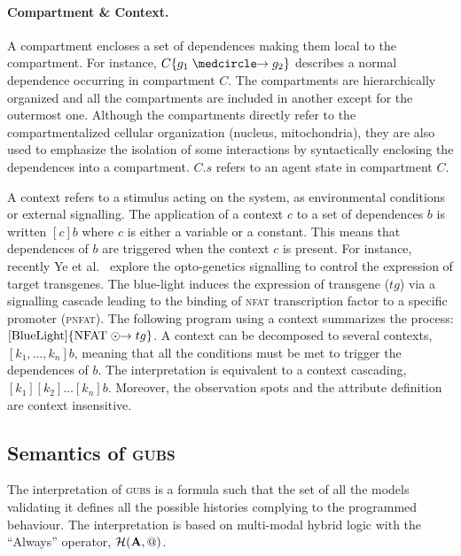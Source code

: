 \documentclass{eptcs}
\newcommand{\eg}[0]{\abbrev{\textit{e.g.}}}
\newcounter{ti}
\begin{document}
\paragraph{Compartment \& Context.} A compartment encloses a set of dependences making them local to the compartment. For instance, $ C \{ g_1 \cause g_2 \}$ describes a normal dependence occurring in compartment $C$. The compartments are hierarchically organized and all the compartments are included in another except for the outermost one.
Although the compartments directly refer to the compartmentalized cellular organization (\eg nucleus, mitochondria), they are also used to emphasize the isolation of some interactions by syntactically enclosing the dependences into a compartment. $C.s$ refers to an agent state in compartment $C$. 

A context refers to a stimulus acting on the system, as environmental conditions or external signalling. The application of a context $c$ to a set of dependences $b$ is written $[c]b$ where $c$ is either a variable or a constant. This means that dependences of $b$ are triggered when the context $c$ is present. For instance, recently Ye et al.~\cite{Ye2011} explore the opto-genetics signalling to control the expression of target transgenes. The blue-light induces the expression of transgene ($tg$) via a signalling cascade leading to the binding of \textsc{nfat} transcription factor to a specific promoter (\textsc{pnfat}). The following program using a context summarizes the process: $[\text{BlueLight}]\{ \text{NFAT}\mathrel{\odot\kern-3.25pt \to} tg\}$. A context can be decomposed to several contexts, $[k_1,\ldots,k_n]b$, meaning that all the conditions must be met to trigger the dependences of $b$. The interpretation is equivalent to a context cascading, $[k_1][k_2]\ldots[k_n]b$. Moreover, the observation spots and the attribute definition are context insensitive.

\subsection{Semantics of \textsc{gubs}}
\label{sec:semantics}
The interpretation of \textsc{gubs} is a formula such that the set of all the 
models validating it defines all the possible histories complying to the programmed behaviour.
The interpretation is based on multi-modal hybrid logic with the ``Always'' operator, $\mathcal H (\textbf A, @)$.
\end{document}
